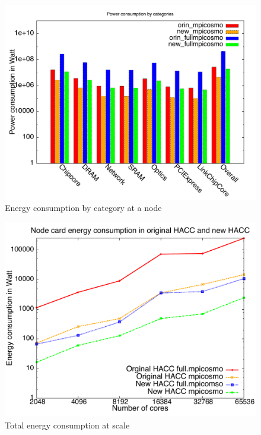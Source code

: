 \begin{figure}[!htb]
\vspace{-0.1in}
\centering
\includegraphics[scale=0.3]{figures/power_cat.pdf}
\vspace{-0.1in}
\caption{Energy consumption by category at a node}
\vspace{-0.1in}
\label{fig:hacc_agg}
\end{figure}

\begin{figure}[!htb]
\vspace{-0.1in}
\centering
\includegraphics[scale=0.3]{figures/power_ncp.pdf}
\vspace{-0.1in}
\caption{Total energy consumption at scale}
\vspace{-0.1in}
\label{fig:hacc_agg}
\end{figure}
